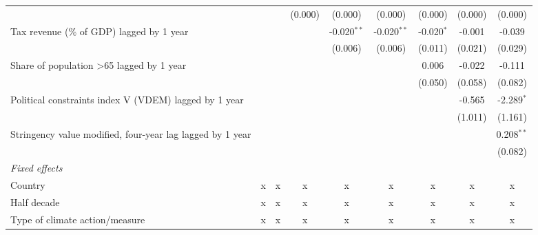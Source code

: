\begin{tabular}{lcccccccc}
                                                             &              &              & (0.000) & (0.000)       & (0.000)       & (0.000)      & (0.000) & (0.000)\\   
   Tax revenue (\% of GDP) lagged by 1 year                  &              &              &         & -0.020$^{**}$ & -0.020$^{**}$ & -0.020$^{*}$ & -0.001  & -0.039\\   
                                                             &              &              &         & (0.006)       & (0.006)       & (0.011)      & (0.021) & (0.029)\\   
   Share of population >65 lagged by 1 year                  &              &              &         &               &               & 0.006        & -0.022  & -0.111\\   
                                                             &              &              &         &               &               & (0.050)      & (0.058) & (0.082)\\   
   Political constraints index V (VDEM) lagged by 1 year     &              &              &         &               &               &              & -0.565  & -2.289$^{*}$\\   
                                                             &              &              &         &               &               &              & (1.011) & (1.161)\\   
   Stringency value modified, four-year lag lagged by 1 year &              &              &         &               &               &              &         & 0.208$^{**}$\\   
                                                             &              &              &         &               &               &              &         & (0.082)\\   
   \emph{Fixed effects}\\
   Country                                                   & x            & x            & x       & x             & x             & x            & x       & x\\  
   Half decade                                               & x            & x            & x       & x             & x             & x            & x       & x\\  
   Type of climate action/measure                            & x            & x            & x       & x             & x             & x            & x       & x\\  

\end{tabular}
